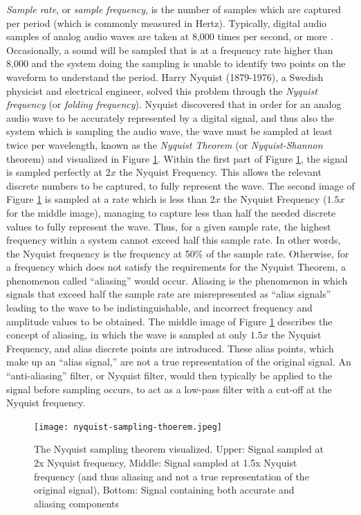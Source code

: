 \textit{Sample rate}, or \textit{sample frequency}, is the number of samples which are captured per period (which is commonly measured in Hertz). Typically, digital audio samples of analog audio waves are taken at 8,000 times per second, or more \cite{Zjalic_2021}. Occasionally, a sound will be sampled that is at a frequency rate higher than 8,000 and the system doing the sampling is unable to identify two points on the waveform to understand the period. Harry Nyquist (1879-1976), a Swedish physicist and electrical engineer, solved this problem through the \textit{Nyquist frequency} \cite{Zjalic_2021} (or \textit{folding frequency}). Nyquist discovered that in order for an analog audio wave to be accurately represented by a digital signal, and thus also the system which is sampling the audio wave, the wave must be sampled at least twice per wavelength, known as the \textit{Nyquist Theorem} (or \textit{Nyquist-Shannon} theorem) \cite{Zjalic_2021} and visualized in Figure \ref{fig:nyquist-sampling-theorem}. Within the first part of Figure \ref{fig:nyquist-sampling-theorem}, the signal is sampled perfectly at $2x$ the Nyquist Frequency. This allows the relevant discrete numbers to be captured, to fully represent the wave. The second image of Figure \ref{fig:nyquist-sampling-theorem} is sampled at a rate which is less than $2x$ the Nyquist Frequency ($1.5x$ for the middle image), managing to capture less than half the needed discrete values to fully represent the wave. Thus, for a given sample rate, the highest frequency within a system cannot exceed half this sample rate. In other words, the Nyquist frequency is the frequency at 50\% of the sample rate. Otherwise, for a frequency which does not satisfy the requirements for the Nyquist Theorem, a phenomenon called ``aliasing'' would occur. Aliasing is the phenomenon in which signals that exceed half the sample rate are misrepresented as ``alias signals'' leading to the wave to be indistinguishable, and incorrect frequency and amplitude values to be obtained. The middle image of Figure \ref{fig:nyquist-sampling-theorem} describes the concept of aliasing, in which the wave is sampled at only $1.5x$ the Nyquist Frequency, and alias discrete points are introduced. These alias points, which make up an ``alias signal,'' are not a true representation of the original signal. An ``anti-aliasing'' filter, or Nyquist filter, would then typically be applied to the signal before sampling occurs, to act as a low-pass filter with a cut-off at the Nyquist frequency. 

\begin{figure}[H]
  \centering
  \texttt{[image: nyquist-sampling-thoerem.jpeg]}
  \caption{The Nyquist sampling theorem visualized. Upper: Signal sampled at 2x Nyquist frequency, Middle: Signal sampled at 1.5x Nyquist frequency (and thus aliasing and not a true representation of the original signal), Bottom: Signal containing both accurate and aliasing components}\cite{Zjalic_2021}
  \label{fig:nyquist-sampling-theorem}
\end{figure}

